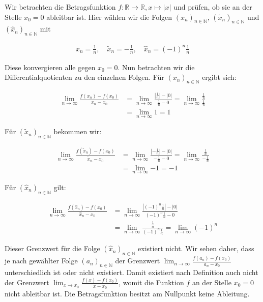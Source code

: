 \documentclass[fontsize=9pt,
               parskip=half-,
               DIV=14,
               listof=chapterentry,
               tocflat]{scrbook}
\begin{document}
\begin{example*}
Wir betrachten die Betragsfunktion $f:\mathbb {R} \to \mathbb {R} ,x\mapsto |x|$ und prüfen, ob sie an der Stelle $x_{0}=0$ ableitbar ist. Hier wählen wir die Folgen $(x_{n})_{n\in \mathbb {N} }$, $({\tilde {x}}_{n})_{n\in \mathbb {N} }$ und $({\hat {x}}_{n})_{n\in \mathbb {N} }$ mit

\begin{align*}
x_{n}={\frac {1}{n}},\quad {\tilde {x}}_{n}=-{\frac {1}{n}},\quad {\hat {x}}_{n}=(-1)^{n}{\frac {1}{n}}
\end{align*}

Diese konvergieren alle gegen $x_{0}=0$. Nun betrachten wir die Differentialquotienten zu den einzelnen Folgen. Für $(x_{n})_{n\in \mathbb {N} }$ ergibt sich:

\begin{align*}
\lim _{n\rightarrow \infty }{\frac {f(x_{n})-f(x_{0})}{x_{n}-x_{0}}}&=\lim _{n\rightarrow \infty }{\frac {|{\frac {1}{n}}|-|0|}{{\frac {1}{n}}-0}}=\lim _{n\rightarrow \infty }{\frac {\frac {1}{n}}{\frac {1}{n}}}\\[0.3em]&=\lim _{n\rightarrow \infty }{1}=1
\end{align*}

Für $({\tilde {x}}_{n})_{n\in \mathbb {N} }$ bekommen wir:

\begin{align*}
\lim _{n\rightarrow \infty }{\frac {f({\tilde {x}}_{n})-f(x_{0})}{{\tilde {x}}_{n}-x_{0}}}&=\lim _{n\rightarrow \infty }{\frac {|-{\tfrac {1}{n}}|-|0|}{-{\tfrac {1}{n}}-0}}=\lim _{n\rightarrow \infty }{\frac {\tfrac {1}{n}}{-{\tfrac {1}{n}}}}\\[0.3em]&=\lim _{n\rightarrow \infty }{-1}=-1
\end{align*}

Für $({\hat {x}}_{n})_{n\in \mathbb {N} }$ gilt:

\begin{align*}
\lim _{n\rightarrow \infty }{\frac {f({\hat {x}}_{n})-f(x_{0})}{{\hat {x}}_{n}-x_{0}}}&=\lim _{n\rightarrow \infty }{\frac {|(-1)^{n}{\tfrac {1}{n}}|-|0|}{(-1)^{n}{\tfrac {1}{n}}-0}}\\[0.3em]&=\lim _{n\rightarrow \infty }{\frac {\tfrac {1}{n}}{(-1)^{n}{\tfrac {1}{n}}}}=\lim _{n\rightarrow \infty }{(-1)^{n}}
\end{align*}

Dieser Grenzwert für die Folge $({\hat {x}}_{n})_{n\in \mathbb {N} }$ existiert nicht. Wir sehen daher, dass je nach gewählter Folge $(a_{n})_{n\in \mathbb {N} }$ der Grenzwert $\lim _{n\to \infty }{\tfrac {f(a_{n})-f(x_{0})}{a_{n}-x_{0}}}$ unterschiedlich ist oder nicht existiert. Damit existiert nach Definition auch nicht der Grenzwert $\lim _{x\to x_{0}}{\tfrac {f(x)-f(x_{0})}{x-x_{0}}}$, womit die Funktion $f$ an der Stelle $x_{0}=0$ nicht ableitbar ist. Die Betragsfunktion besitzt am Nullpunkt keine Ableitung.

\end{example*}
\end{document}
